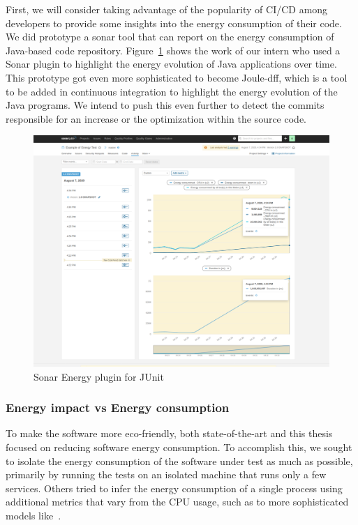 First, we will consider taking advantage of the popularity of CI/CD among developers to provide some insights into the energy consumption of their code.
We did prototype a sonar tool that can report on the energy consumption of Java-based code repository.
Figure~\ref{fig:JunitSonarplugin} shows the work of our intern who used a Sonar plugin to highlight the energy evolution of Java applications over time.
This prototype got even more sophisticated to become Joule-dff, which is a tool to be added in continuous integration to highlight the energy evolution of the Java programs.
We intend to push this even further to detect the commits responsible for an increase or the optimization within the source code.
\begin{figure}[!h]
      \centering
      \includegraphics[width=0.8\linewidth]{chapters/JunitSonarplugin}
      \caption{Sonar Energy plugin for JUnit}
      \label{fig:JunitSonarplugin}
\end{figure}


\subsubsection{Energy impact vs Energy consumption}
To make the software more eco-friendly, both state-of-the-art and this thesis focused on reducing software energy consumption. To accomplish this, we sought to isolate the energy consumption of the software under test as much as possible, primarily by running the tests on an isolated machine that runs only a few services. Others tried to infer the energy consumption of a single process using additional metrics that vary from the CPU usage, such as \cite{noureddine-issta-2016} to more sophisticated models like~\cite{fieni2020smartwatts,fieni2021selfwatts}.

